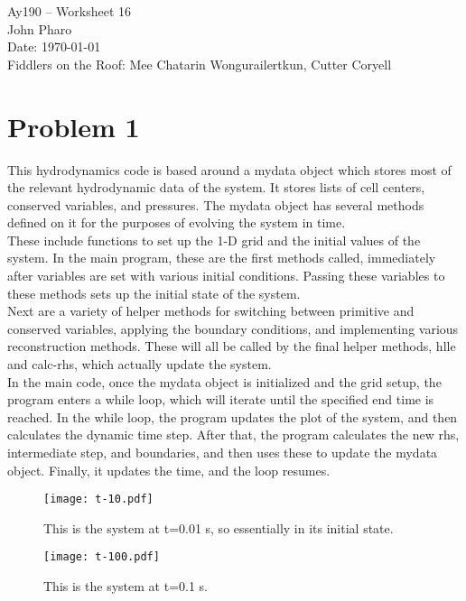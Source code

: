 \documentclass[11pt,letterpaper]{article}
\begin{document}
\begin{center}
\Large
Ay190 -- Worksheet 16\\
John Pharo\\
Date: \today\\
Fiddlers on the Roof: Mee Chatarin Wongurailertkun, Cutter Coryell
\end{center}

\section*{Problem 1}

This hydrodynamics code is based around a mydata object which stores most of the relevant hydrodynamic data of the system. It stores lists of cell centers, conserved variables, and pressures. The mydata object has several methods defined on it for the purposes of evolving the system in time. \\

These include functions to set up the 1-D grid and the initial values of the system. In the main program, these are the first methods called, immediately after variables are set with various initial conditions. Passing these variables to these methods sets up the initial state of the system. \\

Next are a variety of helper methods for switching between primitive and conserved variables, applying the boundary conditions, and implementing various reconstruction methods. These will all be called by the final helper methods, hlle and calc-rhs, which actually update the system. \\

In the main code, once the mydata object is initialized and the grid setup, the program enters a while loop, which will iterate until the specified end time is reached. In the while loop, the program updates the plot of the system, and then calculates the dynamic time step. After that, the program calculates the new rhs, intermediate step, and boundaries, and then uses these to update the mydata object. Finally, it updates the time, and the loop resumes.

\begin{figure}[bth]
\centering
\texttt{[image: t-10.pdf]}
\caption{This is the system at t=0.01 s, so essentially in its initial state.}
\label{fig:simpleplot2}
\end{figure}

\begin{figure}[bth]
\centering
\texttt{[image: t-100.pdf]}
\caption{This is the system at t=0.1 s.}
\label{fig:simpleplot2}
\end{figure}
\end{document}
